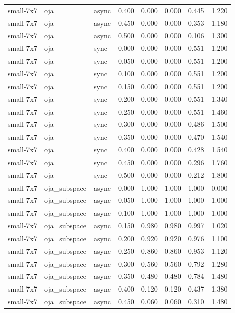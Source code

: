 \begin{tabular}{lllrrrrr}
small-7x7 & oja & async & 0.400 & 0.000 & 0.000 & 0.445 & 1.220 \\
small-7x7 & oja & async & 0.450 & 0.000 & 0.000 & 0.353 & 1.180 \\
small-7x7 & oja & async & 0.500 & 0.000 & 0.000 & 0.106 & 1.300 \\
small-7x7 & oja & sync & 0.000 & 0.000 & 0.000 & 0.551 & 1.200 \\
small-7x7 & oja & sync & 0.050 & 0.000 & 0.000 & 0.551 & 1.200 \\
small-7x7 & oja & sync & 0.100 & 0.000 & 0.000 & 0.551 & 1.200 \\
small-7x7 & oja & sync & 0.150 & 0.000 & 0.000 & 0.551 & 1.200 \\
small-7x7 & oja & sync & 0.200 & 0.000 & 0.000 & 0.551 & 1.340 \\
small-7x7 & oja & sync & 0.250 & 0.000 & 0.000 & 0.551 & 1.460 \\
small-7x7 & oja & sync & 0.300 & 0.000 & 0.000 & 0.486 & 1.500 \\
small-7x7 & oja & sync & 0.350 & 0.000 & 0.000 & 0.470 & 1.540 \\
small-7x7 & oja & sync & 0.400 & 0.000 & 0.000 & 0.428 & 1.540 \\
small-7x7 & oja & sync & 0.450 & 0.000 & 0.000 & 0.296 & 1.760 \\
small-7x7 & oja & sync & 0.500 & 0.000 & 0.000 & 0.212 & 1.800 \\
small-7x7 & oja\_subspace & async & 0.000 & 1.000 & 1.000 & 1.000 & 0.000 \\
small-7x7 & oja\_subspace & async & 0.050 & 1.000 & 1.000 & 1.000 & 1.000 \\
small-7x7 & oja\_subspace & async & 0.100 & 1.000 & 1.000 & 1.000 & 1.000 \\
small-7x7 & oja\_subspace & async & 0.150 & 0.980 & 0.980 & 0.997 & 1.020 \\
small-7x7 & oja\_subspace & async & 0.200 & 0.920 & 0.920 & 0.976 & 1.100 \\
small-7x7 & oja\_subspace & async & 0.250 & 0.860 & 0.860 & 0.953 & 1.120 \\
small-7x7 & oja\_subspace & async & 0.300 & 0.560 & 0.560 & 0.792 & 1.280 \\
small-7x7 & oja\_subspace & async & 0.350 & 0.480 & 0.480 & 0.784 & 1.480 \\
small-7x7 & oja\_subspace & async & 0.400 & 0.120 & 0.120 & 0.437 & 1.380 \\
small-7x7 & oja\_subspace & async & 0.450 & 0.060 & 0.060 & 0.310 & 1.480 \\

\end{tabular}

